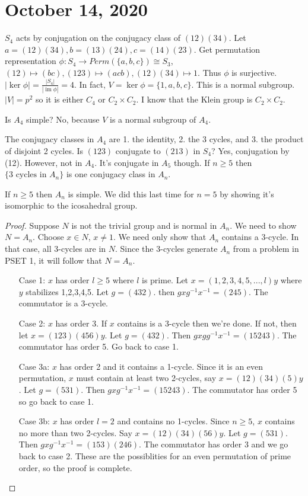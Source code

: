 \documentclass{article}
\newcommand{\ra}[1][]{\xrightarrow{#1}}
\DeclareMathOperator{\im}{im}
\begin{document}
\section{October 14, 2020}
$S_4$ acts by conjugation on the conjugacy class of $(12)(34)$. Let $a=(12)(34), b=(13)(24), c=(14)(23)$. Get permutation representation $\phi: S_4\ra Perm(\{a,b,c\})\cong S_3$, $(12)\mapsto (bc), (123)\mapsto (acb), (12)(34)\mapsto 1$.  Thus $\phi$ is surjective. $|\ker\phi|=\frac{|S_4|}{|\im\phi|}=4$. In fact, $V=\ker\phi=\{1,a,b,c\}$. This is a normal subgroup. $|V|=p^2$ so it is either $C_4$ or $C_2\times C_2$. I know that the Klein group is $C_2\times C_2$.
\begin{example}
Is $A_4$ simple? No, because $V$ is a normal subgroup of $A_4$.
\end{example}
The conjugacy classes in $A_4$ are 1. the identity, 2. the 3 cycles, and 3. the product of disjoint 2 cycles. Is $(123)$ conjugate to $(213)$ in $S_4$? Yes, conjugation by (12). However, not in $A_4$. It's conjugate in $A_5$ though. If $n\geq 5$ then $\{\textrm{3 cycles in }A_n\}$ is one conjugacy class in $A_n$.
\begin{theorem}
If $n\geq 5$ then $A_n$ is simple. We did this last time for $n=5$ by showing it's isomorphic to the icosahedral group.
\end{theorem}
\begin{proof}
Suppose $N$ is not the trivial group and is normal in $A_n$. We need to show $N=A_n$. Choose $x\in N$, $x\neq 1$. We need only show that $A_n$ contains a 3-cycle. In that case, all 3-cycles are in $N$. Since the 3-cycles generate $A_n$ from a problem in PSET 1, it will follow that $N=A_n$.
\begin{enumerate}
    \item[Case 1:] $x$ has order $l\geq 5$ where $l$ is prime. Let $x=(1,2,3,4,5,...,l)y$ where $y$ stabilizes 1,2,3,4,5. Let $g=(432).$ then $gxg^{-1}x^{-1}=(245)$. The commutator is a 3-cycle.
    \item[Case 2:] $x$ has order 3. If $x$ contains is a 3-cycle then we're done. If not, then let $x=(123)(456)y$. Let $g=(432)$. Then $gxgg^{-1}x^{-1}=(15243)$. The commutator has order 5. Go back to case 1.
    \item[Case 3a:] $x$ has order 2 and it contains a 1-cycle. Since it is an even permutation, $x$ must contain at least two 2-cycles, say $x=(12)(34)(5)y$. Let $g=(531)$. Then $gxg^{-1}x^{-1}=(15243)$. The commutator has order 5 so go back to case 1.
    \item[Case 3b:] $x$ has order $l=2$ and contains no 1-cycles. Since $n\geq 5$, $x$ contains no more than two 2-cycles. Say $x=(12)(34)(56)y$. Let $g=(531).$ Then $gxg^{-1}x^{-1}=(153)(246)$. The commutator has order 3 and we go back to case 2. These are the possiblities for an even permutation of prime order, so the proof is complete.
\end{enumerate}
\end{proof}
\end{document}

